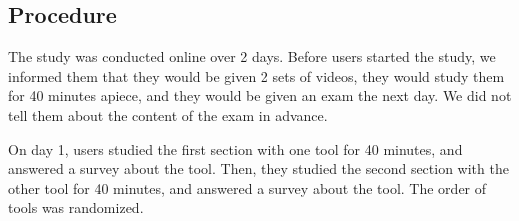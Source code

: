 \documentclass{sigchi}
\begin{document}

\subsection{Procedure}

The study was conducted online over 2 days. Before users started the study, we informed them that they would be given 2 sets of videos, they would study them for 40 minutes apiece, and they would be given an exam the next day. We did not tell them about the content of the exam in advance. %



On day 1, users studied the first section with one tool for 40 minutes, and answered a survey about the tool. Then, they studied the second section with the other tool for 40 minutes, and answered a survey about the tool. The order of tools was randomized. %
\end{document}
